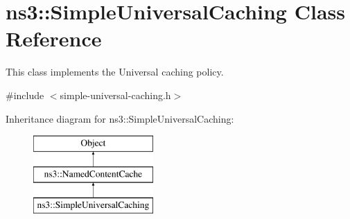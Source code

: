 \hypertarget{classns3_1_1SimpleUniversalCaching}{\section{ns3\-:\-:Simple\-Universal\-Caching Class Reference}
\label{classns3_1_1SimpleUniversalCaching}
}


This class implements the Universal caching policy.  




{\ttfamily \#include $<$simple-\/universal-\/caching.\-h$>$}

Inheritance diagram for ns3\-:\-:Simple\-Universal\-Caching\-:\begin{figure}[H]
\begin{center}
\leavevmode
\includegraphics[height=3.000000cm]{classns3_1_1SimpleUniversalCaching}
\end{center}
\end{figure}
